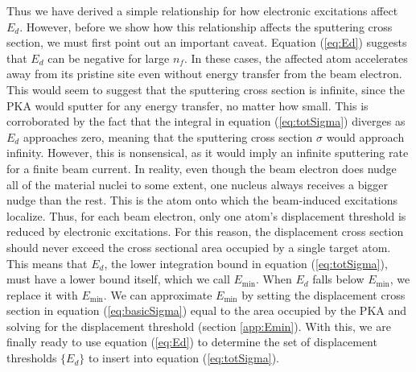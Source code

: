 \documentclass[twoside,twocolumn,9pt]{article}
\begin{document}
Thus we have derived a simple relationship for how electronic excitations
affect $E_d$.
However, before we show how this relationship affects the sputtering cross
section, we must first point out an important caveat.
Equation (\ref{eq:Ed}) suggests that $E_d$ can be negative for large $n_f$.
In these cases, the affected atom accelerates away from its pristine site even
without energy transfer from the beam electron.
This would seem to suggest that the sputtering cross section is infinite, since
the PKA would sputter for any energy transfer, no matter how small.
This is corroborated by the fact that the integral in equation
(\ref{eq:totSigma}) diverges as $E_d$ approaches zero, meaning that the
sputtering cross section $\sigma$ would approach infinity.
However, this is nonsensical, as it would imply an infinite sputtering rate for
a finite beam current.
In reality, even though the beam electron does nudge all of the material nuclei
to some extent, one nucleus always receives a bigger nudge than the rest.
This is the atom onto which the beam-induced excitations localize.
Thus, for each beam electron, only one atom's displacement threshold is reduced
by electronic excitations.
For this reason, the displacement cross section should never exceed the
cross sectional area occupied by a single target atom.
This means that $E_d$, the lower integration bound in equation
(\ref{eq:totSigma}), must have a lower bound itself, which we call
$E_\text{min}$.
When $E_d$ falls below $E_\text{min}$, we replace it with $E_\text{min}$.
We can approximate $E_\text{min}$ by setting the displacement cross section in
equation (\ref{eq:basicSigma}) equal to the area occupied by the PKA and
solving for the displacement threshold (section \ref{app:Emin}).
With this, we are finally ready to use equation (\ref{eq:Ed}) to determine the
set of displacement thresholds $\{E_d\}$ to insert into equation
(\ref{eq:totSigma}).
\end{document}

